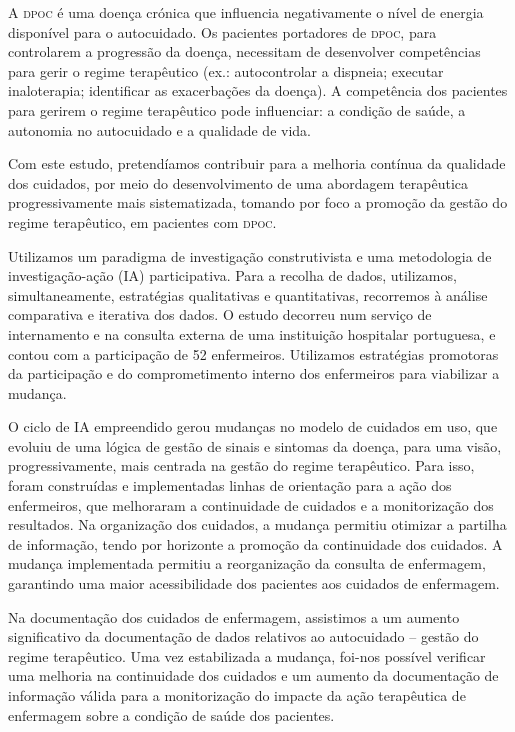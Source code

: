 \documentclass{article}
\begin{document}
A \textsc{dpoc} é uma doença crónica que influencia negativamente o nível de energia
disponível para o autocuidado. Os pacientes portadores de \textsc{dpoc}, para controlarem
a progressão da doença, necessitam de desenvolver competências para gerir o
regime terapêutico (ex.: autocontrolar a dispneia; executar inaloterapia;
identificar as exacerbações da doença). A competência dos pacientes para gerirem
o regime terapêutico pode influenciar: a condição de saúde, a autonomia no
autocuidado e a qualidade de vida.

Com este estudo, pretendíamos contribuir para a melhoria contínua da qualidade
dos cuidados, por meio do desenvolvimento de uma abordagem terapêutica
progressivamente mais sistematizada, tomando por foco a promoção da gestão do
regime terapêutico, em pacientes com \textsc{dpoc}.

Utilizamos um paradigma de investigação construtivista e uma metodologia de
investigação-ação (IA) participativa. Para a recolha de dados, utilizamos,
simultaneamente, estratégias qualitativas e quantitativas, recorremos à análise
comparativa e iterativa dos dados. O estudo decorreu num serviço de internamento
e na consulta externa de uma instituição hospitalar portuguesa, e contou com a
participação de 52 enfermeiros. Utilizamos estratégias promotoras da
participação e do comprometimento interno dos enfermeiros para viabilizar a
mudança.

O ciclo de IA empreendido gerou mudanças no modelo de cuidados em uso, que
evoluiu de uma lógica de gestão de sinais e sintomas da doença, para uma visão,
progressivamente, mais centrada na gestão do regime terapêutico. Para isso,
foram construídas e implementadas linhas de orientação para a ação dos
enfermeiros, que melhoraram a continuidade de cuidados e a monitorização dos
resultados. Na organização dos cuidados, a mudança permitiu otimizar a partilha
de informação, tendo por horizonte a promoção da continuidade dos cuidados. A
mudança implementada permitiu a reorganização da consulta de enfermagem,
garantindo uma maior acessibilidade dos pacientes aos cuidados de enfermagem.

Na documentação dos cuidados de enfermagem, assistimos a um aumento
significativo da documentação de dados relativos ao autocuidado – gestão do
regime terapêutico. Uma vez estabilizada a mudança, foi-nos possível verificar
uma melhoria na continuidade dos cuidados e um aumento da documentação de
informação válida para a monitorização do impacte da ação terapêutica de
enfermagem sobre a condição de saúde dos pacientes.
\end{document}
